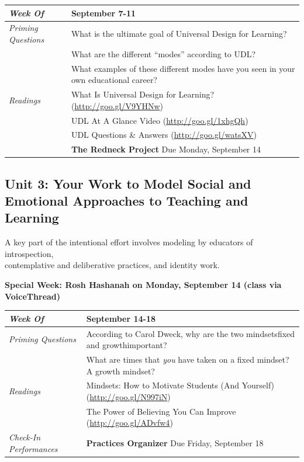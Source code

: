 \documentclass{tufte-handout}
\newcommand{\gentopic}[1]{\begin{fullwidth}\begin{center}\faKey \textsf{#1}\end{center}\end{fullwidth}}
\newcommand{\tabpq}{\faQuestionSign\medspace\textit{Priming Questions}}
\newcommand{\tabread}{\faBook\medspace\textit{Readings}}
\newcommand{\tabdt}{\faCalendar\medspace\textit{Week Of}}
\newcommand{\tabcheckin}{\faPagelines\medspace\textit{Check-In Performances}}
\newcommand{\specialweek}[1]{\begin{fullwidth}\begin{center}\textbf{\faBullhorn\medspace Special Week: #1 \medspace\faBullhorn}\end{center}\end{fullwidth}}
\newenvironment{tabsched}
	{\small
	\begin{tabular}{p{1.5in}p{4.5in}}
	\midrule}
	{\midrule
	\end{tabular}
	\normalsize}
\newcommand{\weekfour}{September 7-11}
\newcommand{\weekfive}{September 14-18}
\newcommand{\roshhashanah}{Rosh Hashanah on Monday, September 14 (class via VoiceThread)}
\begin{document}
\begin{tabsched}
	\tabdt & \weekfour \\
	\midrule
	\tabpq & What is the ultimate goal of Universal Design for Learning? \\
	& What are the different \enquote{modes} according to UDL? \\
	& What examples of these different modes have you seen in your own educational career? \\
	\midrule
	\tabread & What Is Universal Design for Learning? (\url{http://goo.gl/V9YHNw}) \\
	& UDL At A Glance Video (\url{http://goo.gl/1xhgQh}) \\
	& UDL Questions \& Answers (\url{http://goo.gl/watsXV}) \\
	\midrule
	\tabperfomance & \textbf{The Redneck Project} Due Monday, September 14 \\
\end{tabsched}

\newpage

\begin{fullwidth}
	\section{Unit 3: Your Work to Model Social and Emotional Approaches to Teaching and Learning}
\end{fullwidth}

\gentopic{A key part of the intentional effort involves modeling by educators of introspection,\\contemplative and deliberative practices, and identity work.}

\specialweek{\roshhashanah}

\begin{tabsched}
	\tabdt & \weekfive \\
	\midrule
	\tabpq & According to Carol Dweck, why are the two mindsets\textemdash{}fixed and growth\textemdash{}important? \\
	& What are times that \emph{you} have taken on a fixed mindset? A growth mindset? \\
	\midrule
	\tabread & Mindsets: How to Motivate Students (And Yourself) (\url{http://goo.gl/N997iN}) \\
	& The Power of Believing You Can Improve (\url{http://goo.gl/ADvfw4}) \\
	\midrule
	\tabcheckin & \textbf{Practices Organizer} Due Friday, September 18 \\
\end{tabsched}
\end{document}
